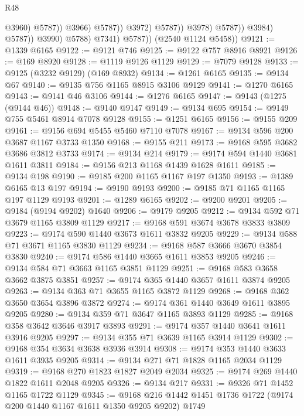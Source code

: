\begin{lexlean}{R48}
\begin{coremodule}
                                              @3960)
                                            @5787))
                                        @3966)
                                      @5787))
                                  @3972)
                                @5787))
                            @3978)
                          @5787))
                      @3984)
                    @5787))
                @3990)
              @5788)
            @7341)
          @5787))
      (@2540 @1124 @5458))
@9121 := @1339 @6165
@9122 := @9121 @746
@9125 := @9122 @757 @8916 @8921
@9126 := @169 @8920
@9128 := @1119 @9126 @1129
@9129 := @7079 @9128
@9133 := @9125 (@3232 @9129) (@169 @8932)
@9134 := @1261 @6165
@9135 := @9134 @67
@9140 := @9135 @756 @1165 @8915 @3106 @9129
@9141 := @1270 @6165
@9143 := @9141 @46 @3106
@9144 := @1276 @6165
@9147 := @9143 (@1275 (@9144 @46))
@9148 := @9140 @9147
@9149 := @9134 @695
@9154 := @9149 @755 @5461 @8914 @7078 @9128
@9155 := @1251 @6165
@9156 := @9155 @209
@9161 := @9156 @694 @5455 @5460 @7110 @7078
@9167 := @9134 @596 @200 @3687 @1167 @3733 @1350
@9168 := @9155 @211
@9173 := @9168 @595 @3682 @3686 @3812 @3733
@9174 := @9134 @214
@9179 := @9174 @594 @1440 @3681 @1611 @3811
@9184 := @9156 @213 @1168 @1439 @1628 @1611
@9185 := @9134 @198
@9190 := @9185 @200 @1165 @1167 @197 @1350
@9193 := @1389 @6165 @13 @197
@9194 := @9190 @9193
@9200 := @9185 @71 @1165 @1165 @197 @1129 @9193
@9201 := @1289 @6165
@9202 := @9200 @9201
@9205 := @9184 (@9194 @9202) @1640
@9206 := @9179 @9205
@9212 := @9134 @592 @71 @3679 @1165 @3809 @1129
@9217 := @9168 @591 @3674 @3678 @3833 @3809
@9223 := @9174 @590 @1440 @3673 @1611 @3832 @9205
@9229 := @9134 @588 @71 @3671 @1165 @3830 @1129
@9234 := @9168 @587 @3666 @3670 @3854 @3830
@9240 := @9174 @586 @1440 @3665 @1611 @3853 @9205
@9246 := @9134 @584 @71 @3663 @1165 @3851 @1129
@9251 := @9168 @583 @3658 @3662 @3875 @3851
@9257 := @9174 @365 @1440 @3657 @1611 @3874 @9205
@9263 := @9134 @363 @71 @3655 @1165 @3872 @1129
@9268 := @9168 @362 @3650 @3654 @3896 @3872
@9274 := @9174 @361 @1440 @3649 @1611 @3895 @9205
@9280 := @9134 @359 @71 @3647 @1165 @3893 @1129
@9285 := @9168 @358 @3642 @3646 @3917 @3893
@9291 := @9174 @357 @1440 @3641 @1611 @3916 @9205
@9297 := @9134 @355 @71 @3639 @1165 @3914 @1129
@9302 := @9168 @354 @3634 @3638 @3936 @3914
@9308 := @9174 @353 @1440 @3633 @1611 @3935 @9205
@9314 := @9134 @271 @71 @1828 @1165 @2034 @1129
@9319 := @9168 @270 @1823 @1827 @2049 @2034
@9325 := @9174 @269 @1440 @1822 @1611 @2048 @9205
@9326 := @9134 @217
@9331 := @9326 @71 @1452 @1165 @1722 @1129
@9345 := @9168 @216 @1442 @1451 @1736 @1722 (@9174 @200 @1440 @1167 @1611 @1350 @9205 @9202) @1749

\end{coremodule}
\end{lexlean}
